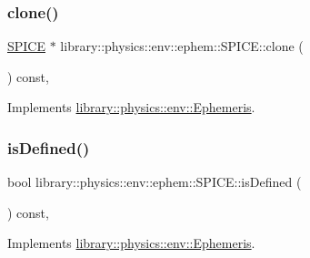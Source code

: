 \mbox{\label{classlibrary_1_1physics_1_1env_1_1ephem_1_1_s_p_i_c_e_a7d397f5472ec2e14d85fa493cb7c9ae0}} 
\subsubsection{\texorpdfstring{clone()}{clone()}}
{\footnotesize\ttfamily \hyperlink{classlibrary_1_1physics_1_1env_1_1ephem_1_1_s_p_i_c_e}{S\+P\+I\+CE} $\ast$ library\+::physics\+::env\+::ephem\+::\+S\+P\+I\+C\+E\+::clone (\begin{DoxyParamCaption}{ }\end{DoxyParamCaption}) const\hspace{0.3cm}{\ttfamily [override]}, {\ttfamily [virtual]}}



Implements \hyperlink{classlibrary_1_1physics_1_1env_1_1_ephemeris_a7ddecd88d91f79ff204100eb9607b591}{library\+::physics\+::env\+::\+Ephemeris}.

\mbox{\label{classlibrary_1_1physics_1_1env_1_1ephem_1_1_s_p_i_c_e_a54fb3fb8768a72f515231dac083eb9cb}} 
\subsubsection{\texorpdfstring{is\+Defined()}{isDefined()}}
{\footnotesize\ttfamily bool library\+::physics\+::env\+::ephem\+::\+S\+P\+I\+C\+E\+::is\+Defined (\begin{DoxyParamCaption}{ }\end{DoxyParamCaption}) const\hspace{0.3cm}{\ttfamily [override]}, {\ttfamily [virtual]}}



Implements \hyperlink{classlibrary_1_1physics_1_1env_1_1_ephemeris_abf61a03e24dd146199381db14d1d7c68}{library\+::physics\+::env\+::\+Ephemeris}.

